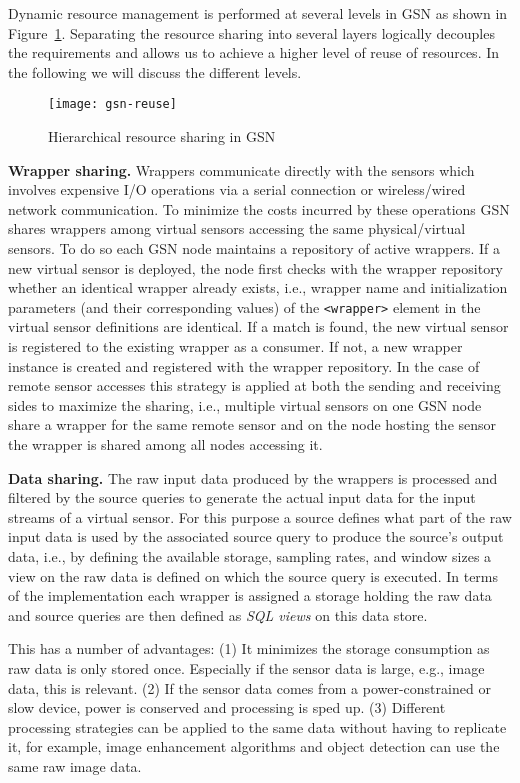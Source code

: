Dynamic resource management is performed at several levels in GSN as
shown in Figure~\ref{fig:resource-layers}. Separating the resource
sharing into several layers logically decouples the requirements and
allows us to achieve a higher level of reuse of resources. In the
following we will discuss the different levels.

\begin{figure}%
  \centering
  \texttt{[image: gsn-reuse]}
  \caption{Hierarchical resource sharing in GSN}
  \label{fig:resource-layers}
\end{figure}

\textbf{Wrapper sharing.} Wrappers communicate directly with the sensors which
involves expensive I/O operations via a serial connection or wireless/wired
network communication. To minimize the costs incurred by these operations GSN
shares wrappers among virtual sensors accessing the same physical/virtual
sensors. To do so each GSN node maintains a repository of active wrappers. If a
new virtual sensor is deployed, the node first checks with the wrapper
repository whether an identical wrapper already exists, i.e., wrapper name and
initialization parameters (and their corresponding values) of the \verb|<wrapper>| element in the virtual sensor
definitions are identical. If a match is found, the new virtual sensor is
registered to the existing wrapper as a consumer. If not, a new wrapper
instance is created and registered with the wrapper repository. In the case of
remote sensor accesses this strategy is applied at both the sending and
receiving sides to maximize the sharing, i.e., multiple virtual sensors on one
GSN node share a wrapper for the same remote sensor and on the node hosting the
sensor the wrapper is shared among all nodes accessing it.

\textbf{Data sharing.} The raw input data produced by the wrappers is processed
and filtered by the source queries to generate the actual input data for the
input streams of a virtual sensor. For this purpose a source defines
what part of the raw input data is used by the associated source query
to produce the source's output data, i.e., by defining the available
storage, sampling rates, and window sizes a view on the raw data is defined on
which the source query is executed. In terms of the implementation each
wrapper is assigned a storage holding the raw data and source queries
are then defined as \emph{SQL views} on this data store.

This has a number of advantages: (1) It minimizes the storage consumption as
raw data is only stored once. Especially if the sensor data is large, e.g.,
image data, this is relevant. (2) If the sensor data comes from a
power-constrained or slow device, power is conserved and processing is sped up.
(3) Different processing strategies can be applied to the same data without
having to replicate it, for example, image enhancement algorithms and object
detection can use the same raw image data.

